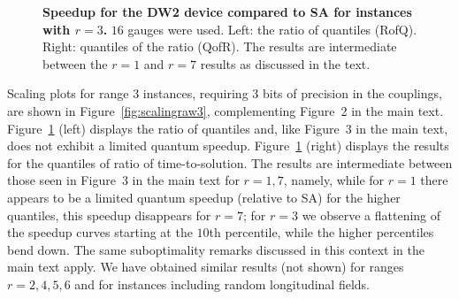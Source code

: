 \begin{figure}[t]
{}
\caption{{\bf Speedup for the DW2 device compared to SA for instances with $r=3$.} $16$ gauges were used. Left: the ratio of quantiles (RofQ). Right:  quantiles of the ratio (QofR).  The results are intermediate between the $r=1$ and $r=7$ results as discussed in the text.}
\label{fig:roq-qofr-speedup3}
\end{figure}

Scaling plots for range $3$ instances, requiring $3$ bits of precision in the couplings, are shown in Figure~\ref{fig:scalingraw3}, complementing Figure~2 in the main text. Figure~\ref{fig:roq-qofr-speedup3} (left) displays the ratio of quantiles and, like Figure~3 in the main text, does not exhibit a limited quantum speedup.
Figure~\ref{fig:roq-qofr-speedup3} (right) displays the results for the quantiles of ratio of time-to-solution. The results are intermediate between those seen in Figure~3 in the main text for $r=1,7$, namely, while for $r=1$ there appears to be a limited quantum speedup (relative to SA) for the higher quantiles, this speedup disappears for $r=7$; for $r=3$ we observe a flattening of the speedup curves starting at the $10$th percentile, while the higher percentiles bend down. The same suboptimality remarks discussed in this context in the main text apply. We have obtained similar results (not shown) for ranges $r=2,4,5,6$ and for instances including random longitudinal fields.

